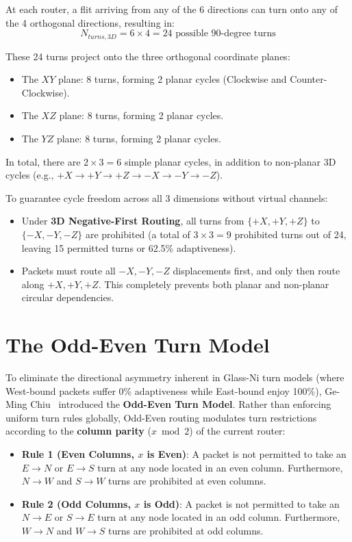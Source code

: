 At each router, a flit arriving from any of the 6 directions can turn onto any of the 4 orthogonal directions, resulting in:
\begin{equation}
N_{turns, 3D} = 6 \times 4 = 24 \text{ possible 90-degree turns}
\label{eq:ch5_3d_turns}
\end{equation}

These 24 turns project onto the three orthogonal coordinate planes:
\begin{itemize}
    \item The $XY$ plane: 8 turns, forming 2 planar cycles (Clockwise and Counter-Clockwise).
    \item The $XZ$ plane: 8 turns, forming 2 planar cycles.
    \item The $YZ$ plane: 8 turns, forming 2 planar cycles.
\end{itemize}
In total, there are $2 \times 3 = 6$ simple planar cycles, in addition to non-planar 3D cycles (e.g., $+X \to +Y \to +Z \to -X \to -Y \to -Z$).

To guarantee cycle freedom across all 3 dimensions without virtual channels:
\begin{itemize}
    \item Under \textbf{3D Negative-First Routing}, all turns from $\{+X, +Y, +Z\}$ to $\{-X, -Y, -Z\}$ are prohibited (a total of $3 \times 3 = 9$ prohibited turns out of 24, leaving 15 permitted turns or 62.5\% adaptiveness).
    \item Packets must route all $-X, -Y, -Z$ displacements first, and only then route along $+X, +Y, +Z$. This completely prevents both planar and non-planar circular dependencies.
\end{itemize}

\section{The Odd-Even Turn Model}
\label{sec:ch5_odd_even}

To eliminate the directional asymmetry inherent in Glass-Ni turn models (where West-bound packets suffer 0\% adaptiveness while East-bound enjoy 100\%), Ge-Ming Chiu~\cite{Chiu2000} introduced the \textbf{Odd-Even Turn Model}. Rather than enforcing uniform turn rules globally, Odd-Even routing modulates turn restrictions according to the \textbf{column parity} ($x \bmod 2$) of the current router:

\begin{definition}
\hfill
\begin{itemize}
    \item \textbf{Rule 1 (Even Columns, $x$ is Even)}: A packet is not permitted to take an $E \to N$ or $E \to S$ turn at any node located in an even column. Furthermore, $N \to W$ and $S \to W$ turns are prohibited at even columns.
    \item \textbf{Rule 2 (Odd Columns, $x$ is Odd)}: A packet is not permitted to take an $N \to E$ or $S \to E$ turn at any node located in an odd column. Furthermore, $W \to N$ and $W \to S$ turns are prohibited at odd columns.
\end{itemize}
\end{definition}

